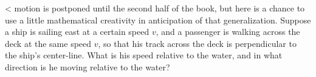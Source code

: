 <%
motion is postponed until the second half of the book, but
here is a chance to use a little mathematical creativity in
anticipation of that generalization. Suppose a ship is
sailing east at a certain speed $v$, and a passenger is
walking across the deck at the same speed $v$, so that his
track across the deck is perpendicular to the ship's
center-line. What is his speed relative to the water, and in
what direction is he moving relative to the water?

